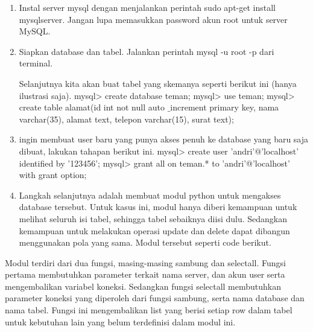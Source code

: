 	\begin{enumerate}
		\item Instal server mysql dengan menjalankan perintah sudo apt-get install mysqlserver. Jangan lupa memasukkan password akun root untuk server MySQL. 
		\item Siapkan database dan tabel. Jalankan perintah mysql -u root -p dari terminal. 


Selanjutnya kita akan buat tabel yang skemanya seperti berikut ini (hanya ilustrasi saja). 
mysql> create database teman; 
mysql> use teman; \hspace*{1.69in}  
mysql> create table alamat(id int not null auto $  \_  $increment primary key, nama varchar(35), alamat text, telepon varchar(15), surat text); 
\vspace{12pt}

\item  ingin membuat user baru yang punya akses penuh ke database yang baru saja dibuat, lakukan tahapan berikut ini. 
mysql> create user 'andri'@'localhost' identified by '123456'; 
mysql> grant all on teman.* to 'andri'@'localhost' with grant option; 

\item Langkah selanjutnya adalah membuat modul python untuk mengakses database tersebut. Untuk kasus ini, modul hanya diberi kemampuan untuk melihat seluruh isi tabel, sehingga tabel sebaiknya diisi dulu. Sedangkan kemampuan untuk melakukan operasi update dan delete dapat dibangun menggunakan pola yang sama. Modul tersebut seperti code berikut. 
\end{enumerate}

\vspace{12pt}
Modul terdiri dari dua fungsi, masing-masing sambung dan selectall. Fungsi pertama membutuhkan parameter terkait nama server, dan akun user serta mengembalikan variabel koneksi. Sedangkan fungsi selectall membutuhkan parameter koneksi yang diperoleh dari fungsi sambung, serta nama database dan nama tabel. Fungsi ini mengembalikan list yang berisi setiap row dalam tabel untuk kebutuhan lain yang belum terdefinisi dalam modul ini. 
\vspace{12pt}

